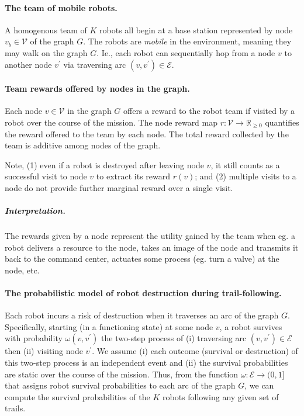\documentclass[11pt, oneside]{article}
\begin{document}
\paragraph{The team of mobile robots.}
A homogenous team of $K$ robots all begin at a base station represented by node $v_b \in \mathcal{V}$ of the graph $G$. The robots are \emph{mobile} in the environment, meaning they may walk on the graph $G$.
Ie., each robot can sequentially hop from a node $v$ to another node $v^\prime$ via traversing arc $(v, v^\prime)\in\mathcal{E}$.

\paragraph{Team rewards offered by nodes in the graph.}
Each node $v\in \mathcal{V}$ in the graph $G$ offers a reward to the robot team if visited by a robot over the course of the mission.
The node reward map $r: \mathcal{V} \rightarrow \mathbb{R}_{\geq 0}$ quantifies the reward offered to the team by each node. 
The total reward collected by the team is additive among nodes of the graph.
 
Note, 
(1) even if a robot is destroyed after leaving node $v$, it still counts as a successful visit to node $v$ to extract its reward $r(v)$; and
(2) multiple visits to a node do not provide further marginal reward over a single visit.

\vspace{-\baselineskip}
\subparagraph{Interpretation.} The rewards given by a node represent the utility gained by the team when eg. a robot delivers a resource to the node, takes an image of the node and transmits it back to the command center, actuates some process (eg. turn a valve) at the node, etc. 


\paragraph{The probabilistic model of robot destruction during trail-following.} 
Each robot incurs a risk of destruction when it traverses an arc of the graph $G$.
Specifically, starting (in a functioning state) at some node $v$, a robot survives with probability $\omega(v, v^\prime)$ the two-step process of (i) traversing arc $(v, v^\prime) \in \mathcal{E}$ then (ii) visiting node $v^\prime$. 
We assume (i) each outcome (survival or destruction) of this two-step process is an independent event and (ii) the survival probabilities are static over the course of the mission. 
Thus, from the function $\omega: \mathcal{E} \rightarrow (0, 1]$ that assigns robot survival probabilities to each arc of the graph $G$, we can compute the survival probabilities of the $K$ robots following any given set of trails.
\end{document}

